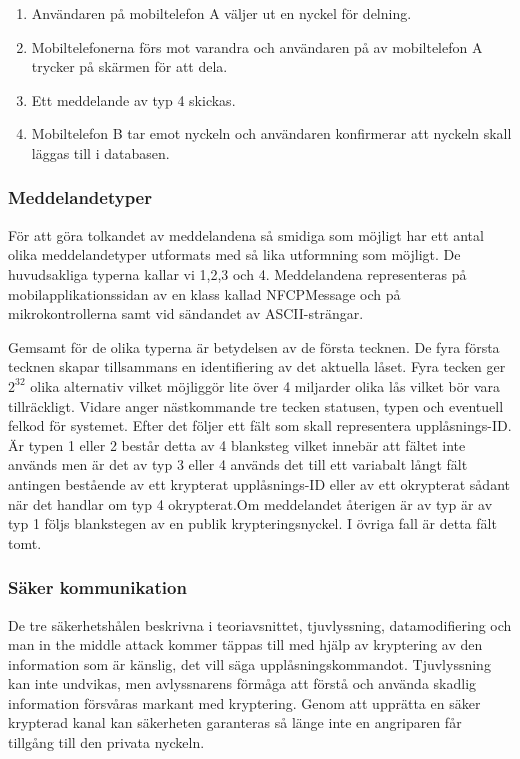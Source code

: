 \documentclass[11pt]{article}
\begin{document}
\begin{enumerate}
\item Användaren på mobiltelefon A väljer ut en nyckel för delning.
\item Mobiltelefonerna förs mot varandra och användaren på av mobiltelefon A trycker på skärmen för att dela.
\item Ett meddelande av typ 4 skickas.
\item Mobiltelefon B tar emot nyckeln och användaren konfirmerar att nyckeln skall läggas till i databasen.
\end{enumerate}

\subsubsection{Meddelandetyper}
För att göra tolkandet av meddelandena så smidiga som möjligt har ett antal olika meddelandetyper utformats med så lika utformning som möjligt. De huvudsakliga typerna kallar vi 1,2,3 och 4. Meddelandena representeras på mobilapplikationssidan av en klass kallad NFCPMessage och på mikrokontrollerna samt vid sändandet av ASCII-strängar. 

Gemsamt för de olika typerna är betydelsen av de första tecknen. De fyra första tecknen skapar tillsammans en identifiering av det aktuella låset. Fyra tecken ger $2^{32} $ olika alternativ vilket möjliggör lite över 4 miljarder olika lås vilket bör vara tillräckligt. Vidare anger nästkommande tre tecken statusen, typen och eventuell felkod för systemet. Efter det följer ett fält som skall representera upplåsnings-ID. Är typen 1 eller 2 består detta av 4 blanksteg vilket innebär att fältet inte används men är det av typ 3 eller 4 används det till ett variabalt långt fält antingen bestående av ett krypterat upplåsnings-ID eller av ett okrypterat sådant när det handlar om typ 4 okrypterat.Om meddelandet återigen är av typ är av typ 1 följs blankstegen av en publik krypteringsnyckel. I övriga fall är detta fält tomt.

\subsubsection{Säker kommunikation}
De tre säkerhetshålen beskrivna i teoriavsnittet, tjuvlyssning, datamodifiering och man in the middle attack  kommer täppas till med hjälp av kryptering av den information som är känslig, det vill säga upplåsningskommandot. Tjuvlyssning kan inte undvikas, men avlyssnarens förmåga att förstå och använda skadlig information försvåras markant med kryptering. Genom att upprätta en säker krypterad kanal kan säkerheten garanteras så länge inte en angriparen får tillgång till den privata nyckeln. 
\end{document}
